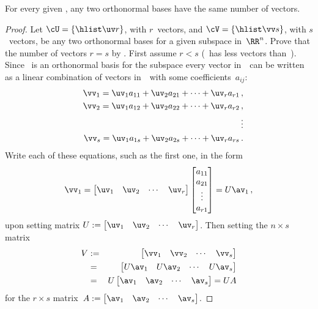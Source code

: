 \begin{theorem} \label{thm:sameD} 
For every given , any two orthonormal bases have the same number of vectors.
\end{theorem}
\begin{proof} 
Let \(\cU=\{\hlist\uv r\}\), with \(r\)~vectors, and \(\cV=\{\hlist\vv s\}\), with \(s\)~vectors, be any two orthonormal bases for a given subspace in~\(\RR^n\).
Prove that the number of vectors \(r=s\) by .
First assume \(r<s\) (\cU\ has less vectors than~\cV).
Since \cU\ is an orthonormal basis for the subspace every vector in~\cV\ can be written as a linear combination of vectors in~\cU\ with some coefficients~\(a_{ij}\):
\begin{eqnarray*}
  &&\vv_1=\uv_1a_{11}+\uv_2a_{21}+\cdots+\uv_ra_{r1}\,,
\\&&\vv_2=\uv_1a_{12}+\uv_2a_{22}+\cdots+\uv_ra_{r2}\,,
\\&&\qquad\vdots
\\&&\vv_s=\uv_1a_{1s}+\uv_2a_{2s}+\cdots+\uv_ra_{rs}\,.
\end{eqnarray*}
Write each of these equations, such as the first one, in the form
\begin{equation*}
\vv_1=\begin{bmatrix} \uv_1&\uv_2&\cdots&\uv_r \end{bmatrix}
\begin{bmatrix} a_{11}\\a_{21}\\\vdots\\a_{r1} \end{bmatrix}
=U\av_1\,,
\end{equation*}
upon setting matrix \(U:=\begin{bmatrix} \uv_1&\uv_2&\cdots&\uv_r \end{bmatrix}\).
Then setting the \(n\times s\) matrix
\begin{eqnarray*}
V&:=&\begin{bmatrix} \vv_1&\vv_2&\cdots&\vv_s \end{bmatrix}
\\&=&\begin{bmatrix} U\av_1& U\av_2&\cdots&U\av_s\end{bmatrix}
\\&=&U\begin{bmatrix} \av_1& \av_2&\cdots&\av_s\end{bmatrix}
=UA
\end{eqnarray*}
for the \(r\times s\) matrix~\(A:=\begin{bmatrix} \av_1& \av_2&\cdots&\av_s \end{bmatrix}\).

\end{proof}
